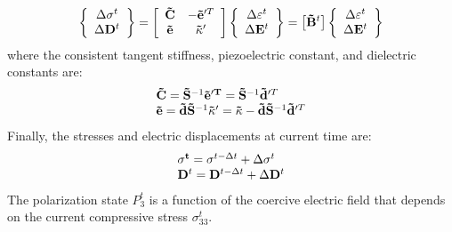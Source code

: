 \begin{equation}  
\left\{ {\begin{array}{*{20}{c}}
{\Delta {{\mathbf{\sigma }}^t}}\\
{\Delta {{\bf{D}}^t}}
\end{array}} \right\} = \left[ {\begin{array}{*{20}{c}}
{{\bf{\tilde C}}}&{ - {\bf{\tilde e}}{'^T}}\\
{{\bf{\tilde e}}}&{{\bf{\tilde \kappa }}'}
\end{array}} \right]\left\{ {\begin{array}{*{20}{c}}
{\Delta {{\mathbf{\varepsilon }}^t}}\\
{\Delta {{\bf{E}}^t}}
\end{array}} \right\} = \left[ {{{{\bf{\tilde B}}}^t}} \right]\left\{ {\begin{array}{*{20}{c}}
{\Delta {{\mathbf{\varepsilon }}^t}}\\
{\Delta {{\bf{E}}^t}}
\end{array}} \right\}
\label{EQN:linearized_polarization_const_derivative_rewritten} 
\end{equation} 
where the consistent tangent stiffness, piezoelectric constant, and dielectric constants are:
\begin{equation}  
\begin{array}{l}
{\bf{\tilde C}} = {{{\bf{\tilde S}}}^{ - 1}}{\rm{               }}{\bf{\tilde e}}{'^{\bf{T}}} = {{{\bf{\tilde S}}}^{ - 1}}{\bf{\tilde d}}{'^T}{\rm{   }}\\
{\bf{\tilde e}} = {\bf{\tilde d}}{{{\bf{\tilde S}}}^{ - 1}}{\rm{              }}{\bf{\tilde \kappa }}' = {\bf{\tilde \kappa }} - {\bf{\tilde d}}{{{\bf{\tilde S}}}^{ - 1}}{\bf{\tilde d}}{'^T}
\end{array}
\label{EQN:tanget_piezoelectric}
\end{equation} 
Finally, the stresses and electric displacements at current time are:
\begin{equation}  
\begin{array}{l}
\mathbf{{\bf{\sigma }}^t} = {{\mathbf{\sigma }}^{t - \Delta t}} + \Delta {{\mathbf{\sigma }}^t}\\
{{\bf{D}}^t} = {{\bf{D}}^{t - \Delta t}} + \Delta {{\bf{D}}^t}
\end{array}
\label{EQN:stress_and_electric_displacement}
\end{equation} 
The polarization state $P^t_3$ is a function of the coercive electric field that depends on the current compressive stress $\sigma^t_{33}$. 
